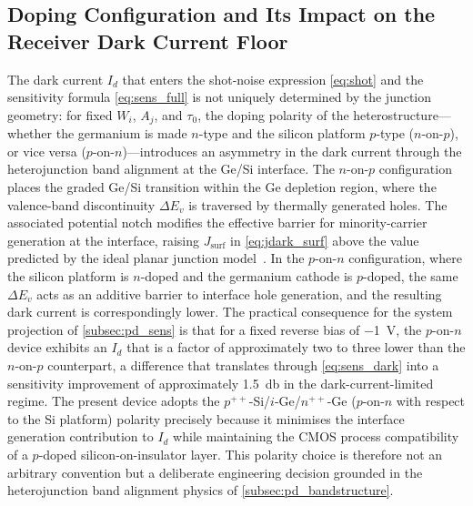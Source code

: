 
\subsection{Doping Configuration and Its Impact on the Receiver Dark Current
            Floor}
\label{subsec:pd_polarity}

The dark current $I_d$ that enters the shot-noise expression \cref{eq:shot}
and the sensitivity formula \cref{eq:sens_full} is not uniquely determined by
the junction geometry: for fixed $W_i$, $A_j$, and $\tau_0$, the doping
polarity of the heterostructure—whether the germanium is made $n$-type and the
silicon platform $p$-type ($n$-on-$p$), or vice versa ($p$-on-$n$)—introduces
an asymmetry in the dark current through the heterojunction band alignment at
the Ge/Si interface. The $n$-on-$p$ configuration places the graded Ge/Si
transition within the Ge depletion region, where the valence-band discontinuity
$\Delta E_v$ is traversed by thermally generated holes. The associated
potential notch modifies the effective barrier for minority-carrier generation
at the interface, raising $J_{\mathrm{surf}}$ in \cref{eq:jdark_surf} above
the value predicted by the ideal planar junction model~\cite{Alasio2024}. In
the $p$-on-$n$ configuration, where the silicon platform is $n$-doped and the
germanium cathode is $p$-doped, the same $\Delta E_v$ acts as an additive
barrier to interface hole generation, and the resulting dark current is
correspondingly lower. The practical consequence for the system projection of
\cref{subsec:pd_sens} is that for a fixed reverse bias of \SI{-1}{\volt}, the
$p$-on-$n$ device exhibits an $I_d$ that is a factor of approximately two to
three lower than the $n$-on-$p$ counterpart, a difference that translates
through \cref{eq:sens_dark} into a sensitivity improvement of approximately
\SI{1.5}{\decibel} in the dark-current-limited regime. The present device
adopts the $p^{++}$-Si/$i$-Ge/$n^{++}$-Ge ($p$-on-$n$ with respect to the
Si platform) polarity precisely because it minimises the interface generation
contribution to $I_d$ while maintaining the CMOS process compatibility of a
$p$-doped silicon-on-insulator layer. This polarity choice is therefore not an
arbitrary convention but a deliberate engineering decision grounded in the
heterojunction band alignment physics of \cref{subsec:pd_bandstructure}.


